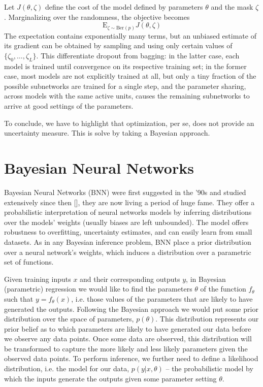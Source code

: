 Let $J(\theta, \zeta)$ define the cost of the model defined by parameters $\theta$ and the mask $\zeta$.
Marginalizing over the randomness, the objective becomes 
$$\mathrm{E}_{\zeta \sim \mathrm{Ber}(p)} J(\theta, \zeta)$$
The expectation contains exponentially many terms, but an unbiased estimate of its gradient can be obtained by sampling and using only certain values of $\{\zeta_0, \dots, \zeta_L\}$. This differentiate dropout from bagging: in the latter case, each model is trained until convergence on its respective training set; in the former case, most models are not explicitly trained at all, but only a tiny fraction of the possible subnetworks are trained for a single step, and the parameter sharing, across models with the same active units, causes the remaining subnetworks to arrive at good settings of the parameters. 

To conclude, we have to highlight that optimization, per se, does not provide an uncertainty measure. This is solve by taking a Bayesian approach.







\section{Bayesian Neural Networks}
Bayesian Neural Networks (BNN) were first suggested in the '90s and studied extensively since then [\cite{MacKay1992, Neal1996}], they are now living a period of huge fame. They offer a probabilistic interpretation of neural networks models by inferring distributions over the models' weights (usually biases are left unbounded). The model offers robustness to overfitting, uncertainty estimates, and can easily learn from small datasets. As in any Bayesian inference problem, BNN place a prior distribution over a neural network’s weights, which induces a distribution over a parametric set of functions. 

Given training inputs $x$ and their corresponding outputs $y$, in Bayesian (parametric) regression we would like to find the parameters $\theta$ of the function $f_\theta$ such that $y = f_\theta(x)$, i.e. those values of the parameters that are likely to have generated the outputs. Following the Bayesian approach we would put some prior distribution over the space of parameters, $p(\theta)$. This distribution represents our prior belief as to which parameters are likely to have generated our data before we observe any data points. Once some data are observed, this distribution will be transformed to capture the more likely and less likely parameters given the observed data points. To perform inference, we further need to define a likelihood distribution, i.e. the model for our data, $p(y|x, \theta)$ -- the probabilistic model by which the inputs generate the outputs given some parameter setting $\theta$. 

